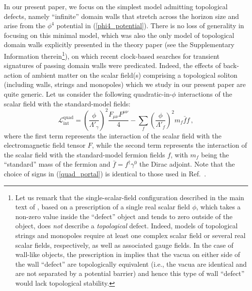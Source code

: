 \documentclass[aps,prd,onecolumn,nofootinbib]{revtex4-2} %
\begin{document}
In our present paper, we focus on the simplest model admitting topological defects, namely ``infinite'' domain walls that stretch across the horizon size and arise from the $\phi^4$ potential in (\ref{phi4_potential}). 
There is no loss of generality in focusing on this minimal model, which was also the only model of topological domain walls explicitly presented in the theory paper \cite{Derevianko_2014_TDM-clocks} (see the Supplementary Information therein\footnote{\normalsize Let us remark that the single-scalar-field configuration described in the main text of \cite{Derevianko_2014_TDM-clocks}, based on a prescription of a single real scalar field $\phi$, which takes a non-zero value inside the ``defect'' object and tends to zero outside of the object, does \textit{not} describe a \textit{topological} defect. Indeed, models of topological strings and monopoles require at least one complex scalar field or several real scalar fields, respectively, as well as associated gauge fields. In the case of wall-like objects, the prescription in \cite{Derevianko_2014_TDM-clocks} implies that the vacua on either side of the wall ``defect'' are topologically equivalent (i.e., the vacua are identical and are not separated by a potential barrier) and hence this type of wall ``defect'' would lack topological stability.}), 
on which recent clock-based searches for transient signatures of passing domain walls were predicated. 
Indeed, the effects of back-action of ambient matter on the scalar field(s) comprising a topological soliton (including walls, strings and monopoles) which we study in our present paper are quite generic. 
Let us consider the following quadratic-in-$\phi$ interactions of the scalar field with the standard-model fields: 
\begin{equation}
\label{quad_portal}
\mathcal{L}_\textrm{int}^\textrm{quad} = \left(\frac{\phi}{\Lambda'_\gamma}\right)^2 \frac{F_{\mu\nu}F^{\mu\nu}}{4} - \sum_f \left(\frac{\phi}{\Lambda'_f}\right)^2 m_f \bar{f}f  \, , 
\end{equation}
where the first term represents the interaction of the scalar field with the electromagnetic field tensor $F$, while the second term represents the interaction of the scalar field with the standard-model fermion fields $f$, with $m_f$ being the ``standard'' mass of the fermion and $\bar{f} = f^\dagger \gamma^0$ the Dirac adjoint. 
Note that the choice of signs in (\ref{quad_portal}) is identical to those used in Ref.~\cite{Derevianko_2014_TDM-clocks}. 
\end{document}
